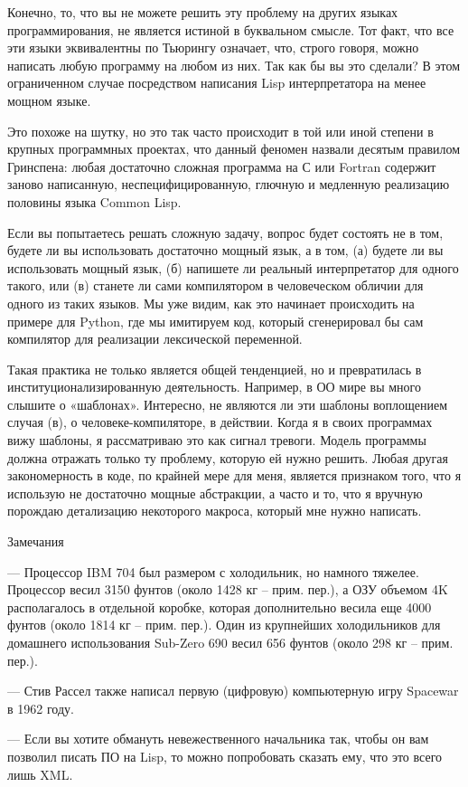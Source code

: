 \documentclass[ebook,12pt,oneside,openany]{memoir}
\begin{document}
Конечно, то, что вы не можете решить эту проблему на других языках
программирования, не является истиной в буквальном смысле. Тот факт,
что все эти языки эквивалентны по Тьюрингу означает, что, строго
говоря, можно написать любую программу на любом из них. Так как бы вы
это сделали? В этом ограниченном случае посредством написания Lisp
интерпретатора на менее мощном языке.

Это похоже на шутку, но это так часто происходит в той или иной
степени в крупных программных проектах, что данный феномен назвали
десятым правилом Гринспена: любая достаточно сложная программа на С
или Fortran содержит заново написанную, неспецифицированную, глючную и
медленную реализацию половины языка Common Lisp.

Если вы попытаетесь решать сложную задачу, вопрос будет состоять не в
том, будете ли вы использовать достаточно мощный язык, а в том, (а)
будете ли вы использовать мощный язык, (б) напишете ли реальный
интерпретатор для одного такого, или (в) станете ли сами компилятором
в человеческом обличии для одного из таких языков. Мы уже видим, как
это начинает происходить на примере для Python, где мы имитируем код,
который сгенерировал бы сам компилятор для реализации лексической
переменной.

Такая практика не только является общей тенденцией, но и превратилась
в институционализированную деятельность. Например, в ОО мире вы много
слышите о «шаблонах». Интересно, не являются ли эти шаблоны
воплощением случая (в), о человеке-компиляторе, в действии. Когда я в
своих программах вижу шаблоны, я рассматриваю это как сигнал тревоги.
Модель программы должна отражать только ту проблему, которую ей нужно
решить. Любая другая закономерность в коде, по крайней мере для меня,
является признаком того, что я использую не достаточно мощные
абстракции, а часто и то, что я вручную порождаю детализацию
некоторого макроса, который мне нужно написать.

Замечания

— Процессор IBM 704 был размером с холодильник, но намного тяжелее.
Процессор весил 3150 фунтов (около 1428 кг – прим. пер.), а ОЗУ
объемом 4K располагалось в отдельной коробке, которая дополнительно
весила еще 4000 фунтов (около 1814 кг – прим. пер.). Один из
крупнейших холодильников для домашнего использования Sub-Zero 690
весил 656 фунтов (около 298 кг – прим. пер.).

— Стив Рассел также написал первую (цифровую) компьютерную игру
Spacewar в 1962 году.

— Если вы хотите обмануть невежественного начальника так, чтобы он вам
позволил писать ПО на Lisp, то можно попробовать сказать ему, что это
всего лишь XML.
\end{document}
